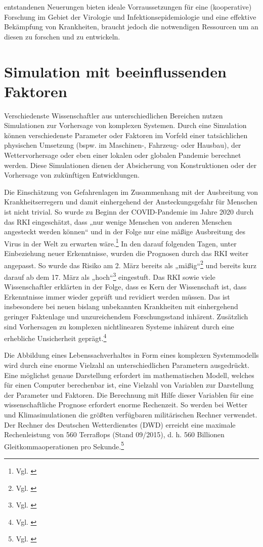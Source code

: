 \documentclass[12pt]{article}
\begin{document}
entstandenen Neuerungen bieten ideale Vorraussetzungen für eine (kooperative) Forschung im Gebiet der Virologie und Infektionsepidemiologie und eine effektive Bekämpfung von Krankheiten, braucht jedoch die notwendigen Ressourcen um an diesen zu forschen und zu entwickeln. 


\section{Simulation mit beeinflussenden Faktoren}
Verschiedenste Wissenschaftler aus unterschiedlichen Bereichen nutzen Simulationen zur Vorhersage von komplexen Systemen. Durch eine Simulation können verschiedenste Parameter oder Faktoren im Vorfeld einer tatsächlichen physischen Umsetzung (bspw. im Maschinen-, Fahrzeug- oder Hausbau), der Wettervorhersage oder eben einer lokalen oder globalen Pandemie berechnet werden. Diese Simulationen dienen der Absicherung von Konstruktionen oder der Vorhersage von zukünftigen Entwicklungen.

Die Einschätzung von Gefahrenlagen im Zusammenhang mit der Ausbreitung von Krankheitserregern und damit einhergehend der Ansteckungsgefahr für Menschen ist nicht trivial. So wurde zu Beginn der COVID-Pandemie im Jahre 2020 durch das RKI eingeschätzt, dass „nur wenige Menschen von anderen Menschen angesteckt werden können“ und in der Folge nur eine mäßige Ausbreitung des Virus in der Welt zu erwarten wäre.\footnote{Vgl. \cite{MerkurRKI}} In den darauf folgenden Tagen, unter Einbeziehung neuer Erkenntnisse, wurden die Prognosen durch das RKI weiter angepasst. So wurde das Risiko am 2. März bereits als „mäßig“\footnote{Vgl. \cite{ARDMedia01}} und bereits kurz darauf ab dem 17. März als „hoch“\footnote{Vgl. \cite{RKIhoch}} eingestuft. Das RKI sowie viele Wissenschaftler erklärten in der Folge, dass es Kern der Wissenschaft ist, dass Erkenntnisse immer wieder geprüft und revidiert werden müssen. Das ist insbesondere bei neuen bislang unbekannten Krankheiten mit einhergehend geringer Faktenlage und unzureichendem Forschungsstand inhärent. Zusätzlich sind Vorhersagen zu komplexen nichtlinearen Systeme inhärent durch eine erhebliche Unsicherheit geprägt.\footnote{Vgl. \cite{ZDFWissenschaft}}

Die Abbildung eines Lebenssachverhaltes in Form eines komplexen Systemmodells wird durch eine enorme Vielzahl an unterschiedlichen Parametern ausgedrückt. Eine möglichst genaue Darstellung erfordert im mathematischen Modell, welches für einen Computer berechenbar ist, eine Vielzahl von Variablen zur Darstellung der Parameter und Faktoren. Die Berechnung mit Hilfe dieser Variablen für eine wissenschaftliche Prognose erfordert enorme Rechenzeit. So werden bei Wetter und Klimasimulationen die größten verfügbaren militärischen Rechner verwendet. Der Rechner des Deutschen Wetterdienstes (DWD) erreicht eine maximale Rechenleistung von 560 Terraflops (Stand 09/2015), d. h. 560 Billionen Gleitkommaoperationen pro Sekunde.\footnote{Vgl. \cite{WeltDerPhysik}}
\end{document}
